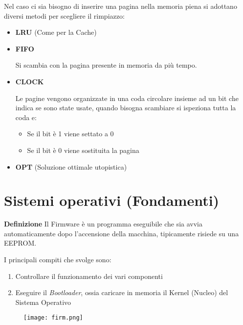 \documentclass{article}
\begin{document}
\newpage

\noindent Nel caso ci sia bisogno di inserire una pagina nella memoria piena si adottano diversi metodi per scegliere il rimpiazzo:
\begin{itemize}
    \item \textbf{LRU} (Come per la Cache)

    \item \textbf{FIFO}

        Si scambia con la pagina presente in memoria da più tempo.

    \item \textbf{CLOCK}

        Le pagine vengono organizzate in una coda circolare insieme ad un bit che indica se sono state usate, quando bisogna scambiare si ispeziona tutta la coda e:
        \begin{itemize}
            \item Se il bit è 1 viene settato a 0
            \item Se il bit è 0 viene sostituita la pagina
        \end{itemize}

    \item \textbf{OPT} (Soluzione ottimale utopistica)
    
\end{itemize}

\section{Sistemi operativi (Fondamenti)}

\textbf{Definizione} Il Firmware è un programma eseguibile che sia avvia automaticamente dopo l'accensione della macchina, tipicamente risiede su una EEPROM.\newline

\noindent I principali compiti che svolge sono:
\begin{enumerate}
    \item Controllare il funzionamento dei vari componenti
    \item Eseguire il \textit{Bootloader}, ossia caricare in memoria il Kernel (Nucleo) del Sistema Operativo\newline
\end{enumerate}

\begin{figure}[ht]
    \centering
    \texttt{[image: firm.png]}
    \label{fig:firmware}
\end{figure}
\end{document}
